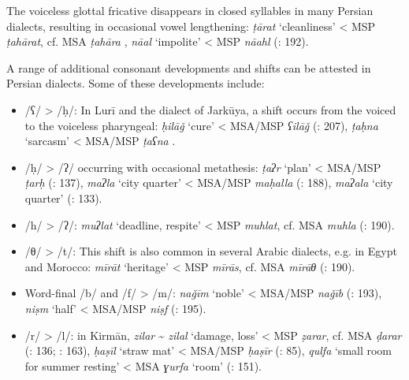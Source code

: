 \documentclass[output=paper]{langsci/langscibook}
\begin{document}

The voiceless glottal fricative disappears in closed syllables in many Persian dialects, resulting in occasional vowel lengthening: \textit{ṭārat} ‘cleanliness’ < MSP \textit{ṭahārat}, cf. MSA \textit{ṭahāra} \citep[76]{Sarlak2002}, \textit{nāal} ‘impolite’ < MSP \textit{nāahl} (\citealt{Īzadpanāh2001}: 192).


A range of additional consonant developments and shifts can be attested in Persian dialects. Some of these developments include:

\begin{itemize}
\item[] 
/ʕ/ > /ḥ/: In Lurī and the dialect of Jarkūya, a shift occurs from the voiced to the voiceless pharyngeal: \textit{ḥilāǧ} ‘cure’ < MSA/MSP \textit{ʕilāǧ} (\citealt{Īzadpanāh2001}: 207), \textit{ṭaḥna} ‘sarcasm’ < MSA/MSP \textit{ṭaʕna} \citep{Borjian2008}.

\item[]
/ḥ/ > /ʔ/ occurring with occasional metathesis: \textit{ṭaʔr} ‘plan’ < MSA/MSP \textit{ṭarḥ} (\citealt{Ṣarrāfī1996}: 137), \textit{maʔla} ‘city quarter’ < MSA/MSP \textit{maḥalla} (\citealt{Ṣarrāfī1996}: 188), \textit{maʔala} ‘city quarter’ (\citealt{NaǧībiFīni2002}: 133).

\item[]
/h/ > /ʔ/: \textit{muʔlat} ‘deadline, respite’ < MSP \textit{muhlat}, cf. MSA \textit{muhla} (\citealt{Ṣarrāfī1996}: 190).

\item[]
/θ/ > /t/: This shift is also common in several Arabic dialects, e.g. in Egypt and Morocco: \textit{mīrāt} ‘heritage’ < MSP \textit{mīrās}, cf. MSA \textit{mīrāθ} (\citealt{Īzadpanāh2001}: 190).

\item[]
Word-final /b/ and /f/ > /m/: \textit{naǧīm} ‘noble’ < MSA/MSP \textit{naǧīb} (\citealt{Īzadpanāh2001}: 193), \textit{niṣm} ‘half’ < MSA/MSP \textit{niṣf} (\citealt{Īzadpanāh2001}: 195).

\item[]
/r/ > /l/: in Kirmān, \textit{zilar} \~{} \textit{zilal} ‘damage, loss’ < MSP \textit{ẓarar}, cf. MSA \textit{ḍarar} (\citealt{Ṣarrāfī1996}: 136; \citealt{Dānišgar1995}: 163), \textit{ḥaṣīl} ‘straw mat’ < MSA/MSP \textit{ḥaṣīr} (\citealt{Ṣarrāfī1996}: 85), \textit{qulfa} ‘small room for summer resting’ < MSA \textit{ɣurfa} ‘room’ (\citealt{Fāẓilī2004}: 151).


\end{itemize}
\end{document}
